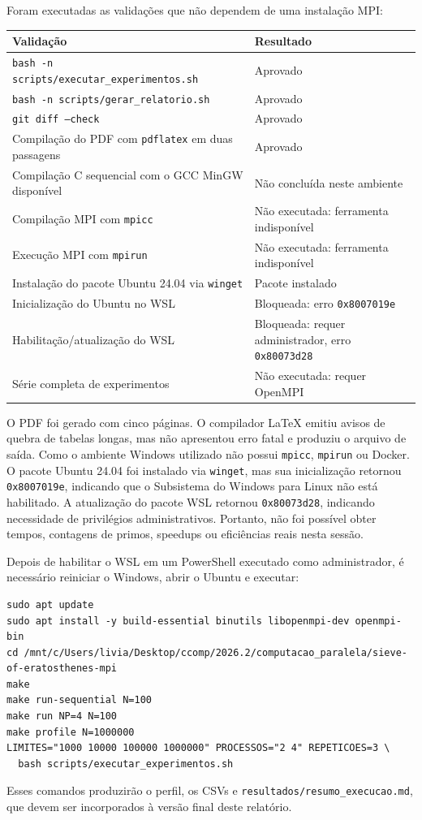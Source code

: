 \documentclass[12pt,a4paper]{article}
\begin{document}
Foram executadas as validações que não dependem de uma instalação MPI:

\begin{center}
\begin{tabular}{p{}p{}}
\toprule
\textbf{Validação} & \textbf{Resultado} \\
\midrule
\texttt{bash -n scripts/executar\_experimentos.sh} & Aprovado \\
\texttt{bash -n scripts/gerar\_relatorio.sh} & Aprovado \\
\texttt{git diff --check} & Aprovado \\
Compilação do PDF com \texttt{pdflatex} em duas passagens & Aprovado \\
Compilação C sequencial com o GCC MinGW disponível & Não concluída neste ambiente \\
Compilação MPI com \texttt{mpicc} & Não executada: ferramenta indisponível \\
Execução MPI com \texttt{mpirun} & Não executada: ferramenta indisponível \\
Instalação do pacote Ubuntu 24.04 via \texttt{winget} & Pacote instalado \\
Inicialização do Ubuntu no WSL & Bloqueada: erro \texttt{0x8007019e} \\
Habilitação/atualização do WSL & Bloqueada: requer administrador, erro \texttt{0x80073d28} \\
Série completa de experimentos & Não executada: requer OpenMPI \\
\bottomrule
\end{tabular}
\end{center}

O PDF foi gerado com cinco páginas. O compilador LaTeX emitiu avisos de
quebra de tabelas longas, mas não apresentou erro fatal e produziu o arquivo
de saída. Como o ambiente Windows utilizado não possui \texttt{mpicc},
\texttt{mpirun} ou Docker. O pacote Ubuntu 24.04 foi instalado via
\texttt{winget}, mas sua inicialização retornou \texttt{0x8007019e}, indicando
que o Subsistema do Windows para Linux não está habilitado. A atualização do
pacote WSL retornou \texttt{0x80073d28}, indicando necessidade de privilégios
administrativos. Portanto, não foi possível obter tempos, contagens de
primos, speedups ou eficiências reais nesta sessão.

Depois de habilitar o WSL em um PowerShell executado como administrador,
é necessário reiniciar o Windows, abrir o Ubuntu e executar:

\begin{lstlisting}
sudo apt update
sudo apt install -y build-essential binutils libopenmpi-dev openmpi-bin
cd /mnt/c/Users/livia/Desktop/ccomp/2026.2/computacao_paralela/sieve-of-eratosthenes-mpi
make
make run-sequential N=100
make run NP=4 N=100
make profile N=1000000
LIMITES="1000 10000 100000 1000000" PROCESSOS="2 4" REPETICOES=3 \
  bash scripts/executar_experimentos.sh
\end{lstlisting}

Esses comandos produzirão o perfil, os CSVs e
\texttt{resultados/resumo\_execucao.md}, que devem ser incorporados à versão
final deste relatório.
\end{document}

